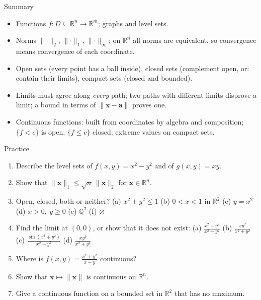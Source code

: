 \documentclass[10pt]{wosm-slides}
\newcommand{\R}{\mathbb{R}}
\newcommand{\norm}[1]{\lVert #1 \rVert}
\newcommand{\vx}{\mathbf{x}}
\newcommand{\va}{\mathbf{a}}
\begin{document}
\begin{frame}{Summary}
  \begin{itemize}
    \item Functions $f\colon D \subseteq \R^n \to \R^m$; graphs and level sets.
    \item Norms $\norm{\cdot}_2$, $\norm{\cdot}_1$, $\norm{\cdot}_\infty$; on $\R^n$ all norms are
      equivalent, so convergence means convergence of each coordinate.
    \item Open sets (every point has a ball inside), closed sets (complement open, or: contain
      their limits), compact sets (closed and bounded).
    \item Limits must agree along \emph{every} path; two paths with different limits disprove a
      limit; a bound in terms of $\norm{\vx - \va}$ proves one.
    \item Continuous functions: built from coordinates by algebra and composition;
      $\{f < c\}$ is open, $\{f \le c\}$ closed; extreme values on compact sets.
  \end{itemize}
\end{frame}

\begin{frame}{Practice}
  \small
  \begin{enumerate}
    \item Describe the level sets of $f(x, y) = x^2 - y^2$ and of $g(x, y) = xy$.
    \item Show that $\norm{\vx}_1 \le \sqrt n\, \norm{\vx}_2$ for $\vx \in \R^n$.
    \item Open, closed, both or neither?
      (a) $x^2 + y^2 \le 1$ \quad (b) $0 < x < 1$ in $\R^2$ \quad (c) $y = x^2$ \quad
      (d) $x > 0, \ y \ge 0$ \quad (e) $\mathbb{Q}^2$ \quad (f) $\varnothing$
    \item Find the limit at $(0, 0)$, or show that it does not exist:
      (a) $\frac{x^2 - y^2}{x^2 + y^2}$ \quad (b) $\frac{x y^2}{x^2 + y^2}$ \quad
      (c) $\frac{\sin(x^2 + y^2)}{x^2 + y^2}$ \quad (d) $\frac{x y^2}{x^2 + y^4}$
    \item Where is $f(x, y) = \frac{x^2 + y^2}{x - y}$ continuous?
    \item Show that $\vx \mapsto \norm{\vx}$ is continuous on $\R^n$.
    \item Give a continuous function on a bounded set in $\R^2$ that has no maximum.
  \end{enumerate}
\end{frame}
\end{document}
